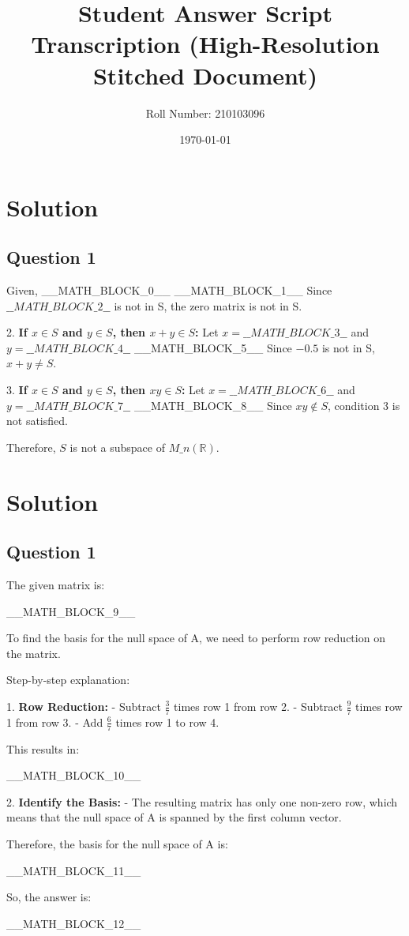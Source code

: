 \documentclass[12pt]{article}
\title{Student Answer Script Transcription (High-Resolution Stitched Document)}
\author{Roll Number: 210103096}
\date{\today}
\begin{document}
\maketitle

\section*{Solution}

\subsection*{Question 1}

Given,
\_\_MATH\_BLOCK\_0\_\_
   \_\_MATH\_BLOCK\_1\_\_
   Since \(\_\_MATH\_BLOCK\_2\_\_\) is not in S, the zero matrix is not in S.

2. \textbf{If \( x \in S \) and \( y \in S \), then \( x + y \in S \):}
   Let \( x = \_\_MATH\_BLOCK\_3\_\_ \) and \( y = \_\_MATH\_BLOCK\_4\_\_ \)
   \_\_MATH\_BLOCK\_5\_\_
   Since \(-0.5\) is not in S, \(x + y \neq S\).

3. \textbf{If \( x \in S \) and \( y \in S \), then \( xy \in S \):}
   Let \( x = \_\_MATH\_BLOCK\_6\_\_ \) and \( y = \_\_MATH\_BLOCK\_7\_\_ \)
   \_\_MATH\_BLOCK\_8\_\_
   Since \( xy \notin S \), condition 3 is not satisfied.

Therefore, \( S \) is not a subspace of \( M\_n(\mathbb{R}) \).

\section*{Solution}

\subsection*{Question 1}

The given matrix is:

\_\_MATH\_BLOCK\_9\_\_

To find the basis for the null space of A, we need to perform row reduction on the matrix.

Step-by-step explanation:

1. \textbf{Row Reduction:}
   - Subtract \( \frac{3}{7} \) times row 1 from row 2.
   - Subtract \( \frac{9}{7} \) times row 1 from row 3.
   - Add \( \frac{6}{7} \) times row 1 to row 4.

This results in:

\_\_MATH\_BLOCK\_10\_\_

2. \textbf{Identify the Basis:}
   - The resulting matrix has only one non-zero row, which means that the null space of A is spanned by the first column vector.

Therefore, the basis for the null space of A is:

\_\_MATH\_BLOCK\_11\_\_

So, the answer is:

\_\_MATH\_BLOCK\_12\_\_
\end{document}
